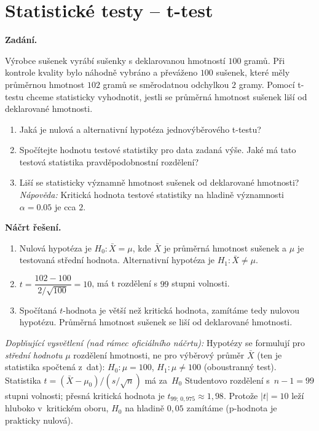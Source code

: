 \section{Statistické testy -- t-test}

\noindent\textbf{Zadání.}\par
Výrobce sušenek vyrábí sušenky s deklarovanou hmotností $100$ gramů. Při kontrole kvality bylo náhodně
vybráno a převáženo $100$ sušenek, které měly průměrnou hmotnost $102$ gramů se směrodatnou odchylkou
$2$ gramy. Pomocí t-testu chceme statisticky vyhodnotit, jestli se průměrná hmotnost sušenek liší od
deklarované hmotnosti.

\begin{enumerate}
  \item Jaká je nulová a alternativní hypotéza jednovýběrového t-testu?
  \item Spočítejte hodnotu testové statistiky pro data zadaná výše. Jaké má tato testová statistika
    pravděpodobnostní rozdělení?
  \item Liší se statisticky významně hmotnost sušenek od deklarované hmotnosti? \textit{Nápověda:}
    Kritická hodnota testové statistiky na hladině významnosti $\alpha = 0.05$ je cca $2$.
\end{enumerate}

\medskip
\noindent\textbf{Náčrt řešení.}\par
\begin{enumerate}
  \item Nulová hypotéza je $H_0 : \bar{X} = \mu$, kde $\bar{X}$ je průměrná hmotnost sušenek a $\mu$ je
    testovaná střední hodnota. Alternativní hypotéza je $H_1 : \bar{X} \neq \mu$.
  \item $t = \dfrac{102 - 100}{2/\sqrt{100}} = 10$, má t rozdělení s $99$ stupni volnosti.
  \item Spočítaná $t$-hodnota je větší než kritická hodnota, zamítáme tedy nulovou hypotézu. Průměrná
    hmotnost sušenek se liší od deklarované hmotnosti.
\end{enumerate}

\medskip
\noindent\textit{Doplňující vysvětlení (nad rámec oficiálního náčrtu):} Hypotézy se formulují pro \emph{střední hodnotu} $\mu$ rozdělení hmotnosti, ne pro výběrový průměr $\bar X$ (ten je statistika spočtená z~dat): $H_0\colon \mu=100$, $H_1\colon \mu\neq 100$ (oboustranný test). Statistika $t=(\bar X-\mu_0)/(s/\sqrt n)$ má za~$H_0$ Studentovo rozdělení s~$n-1=99$ stupni volnosti; přesná kritická hodnota je $t_{99;\,0{,}975}\approx 1{,}98$. Protože $|t|=10$ leží hluboko v~kritickém oboru, $H_0$ na hladině $0{,}05$ zamítáme (p-hodnota je prakticky nulová).
